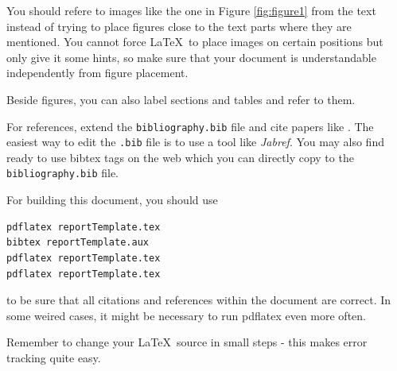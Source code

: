 \documentclass{utue} %
\begin{document}
You should refere to images like the one in Figure \ref{fig:figure1} from the text instead of trying to place figures close to the text parts where they are mentioned. You cannot force \LaTeX~to place images on certain positions but only give it some hints, so make sure that your document is understandable independently from figure placement.

Beside figures, you can also label sections and tables and refer to them.

For references, extend the \texttt{bibliography.bib} file and cite papers like \cite{Miller1995}. The easiest way to edit the \texttt{.bib} file is to use a tool like \emph{Jabref}. You may also find ready to use bibtex tags on the web which you can directly copy to the \texttt{bibliography.bib} file.

For building this document, you should use 
\begin{lstlisting}[firstnumber=1]
pdflatex reportTemplate.tex
bibtex reportTemplate.aux
pdflatex reportTemplate.tex
pdflatex reportTemplate.tex
\end{lstlisting}
to be sure that all citations and references within the document are correct. In some weired cases, it might be necessary to run pdflatex even more often.

Remember to change your \LaTeX~source in small steps - this makes error tracking quite easy.




\end{document}
